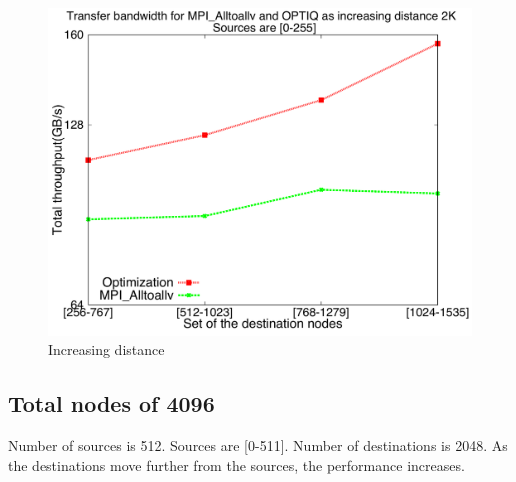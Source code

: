 \documentclass[letter]{article}
\begin{document}
\begin{figure}[h]
\vspace{-0.1in}
\centering
\includegraphics[scale=0.40]{report_figures/incrdist/incrdist_2k.pdf}
\vspace{-0.1in}
\caption{Increasing distance}
\vspace{-0.1in}
\label{fig:incrdist_2k}
\end{figure}

\clearpage
\newpage





\clearpage
\newpage

\subsection{Total nodes of 4096}

Number of sources is 512. Sources are [0-511]. Number of destinations is 2048. As the destinations move further from the sources, the performance increases.
\end{document}
